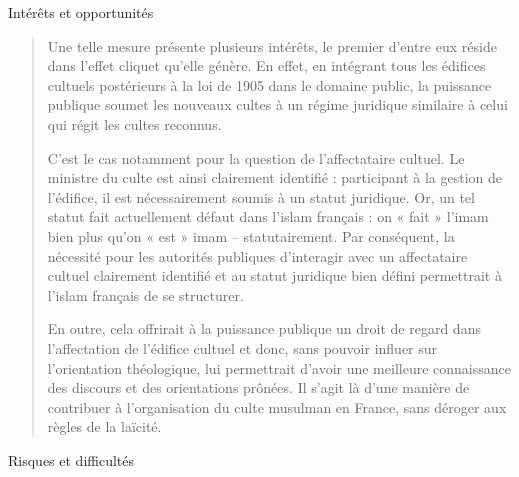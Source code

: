 Intérêts et opportunités

\begin{quote}
Une telle mesure présente plusieurs intérêts, le premier d'entre eux
réside dans l'effet cliquet qu'elle génère. En effet, en intégrant tous
les édifices cultuels postérieurs à la loi de 1905 dans le domaine
public, la puissance publique soumet les nouveaux cultes à un régime
juridique similaire à celui qui régit les cultes reconnus.

C'est le cas notamment pour la question de l'affectataire cultuel. Le
ministre du culte est ainsi clairement identifié : participant à la
gestion de l'édifice, il est nécessairement soumis à un statut
juridique. Or, un tel statut fait actuellement défaut dans l'islam
français : on « fait » l'imam bien plus qu'on « est » imam --
statutairement. Par conséquent, la nécessité pour les autorités
publiques d'interagir avec un affectataire cultuel clairement identifié
et au statut juridique bien défini permettrait à l'islam français de se
structurer.

En outre, cela offrirait à la puissance publique un droit de regard dans
l'affectation de l'édifice cultuel et donc, sans pouvoir influer sur
l'orientation théologique, lui permettrait d'avoir une meilleure
connaissance des discours et des orientations prônées. Il s'agit là
d'une manière de contribuer à l'organisation du culte musulman en
France, sans déroger aux règles de la laïcité.
\end{quote}

Risques et difficultés


